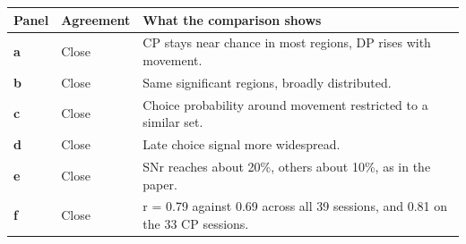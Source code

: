 \begin{longtable}{@{}p{1.1cm}p{2.5cm}p{11.8cm}@{}}
\toprule
Panel & Agreement & What the comparison shows \\
\midrule
\endhead
\textbf{a} & Close & CP stays near chance in most regions, DP rises with movement. \\
\textbf{b} & Close & Same significant regions, broadly distributed. \\
\textbf{c} & Close & Choice probability around movement restricted to a similar set. \\
\textbf{d} & Close & Late choice signal more widespread. \\
\textbf{e} & Close & SNr reaches about 20\%, others about 10\%, as in the paper. \\
\textbf{f} & Close & r = 0.79 against 0.69 across all 39 sessions, and 0.81 on the 33 CP sessions. \\
\bottomrule
\end{longtable}
